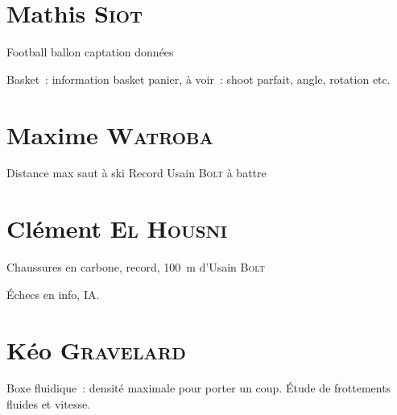 \documentclass[a4paper, 11pt, final, garamond]{book}
\begin{document}
\section{Mathis \textsc{Siot}}

Football ballon captation données

Basket~: information basket panier, à voir~: shoot parfait, angle, rotation etc.

\section{Maxime \textsc{Watroba}}
Distance max saut à ski
Record Usain \textsc{Bolt} à battre

\section{Clément \textsc{El Housni}}
Chaussures en carbone, record, \SI{100}{m} d'Usain \textsc{Bolt}

Échecs en info, IA.

\section{Kéo \textsc{Gravelard}}
Boxe fluidique~: densité maximale pour porter un coup. Étude de frottements
fluides et vitesse.
\end{document}
